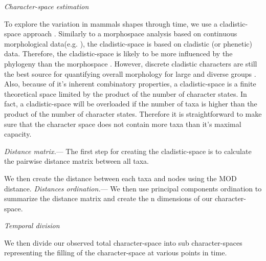 \documentclass[12pt,letterpaper]{article}
\renewcommand{\subsection}[1]{%
\bigskip
\begin{center}
\begin{large}
\normalfont\itshape #1
\end{large}
\end{center}}
\renewcommand{\subsubsection}[1]{%
\vspace{2ex}
\noindent
\textit{#1.}---}
\begin{document}
\subsection{Character-space estimation}
To explore the variation in mammals shapes through time, we use a cladistic-space approach \cite{Foote01071994,Foote29111996,Wesley-Hunt2005,Brusatte12092008,friedmanexplosive2010,toljagictriassic-jurassic2013}. Similarly to a morphospace analysis based on continuous morphological data(e.g. \cite{finlay2015morphological}), the cladistic-space is based on cladistic (or phenetic) data. Therefore, the cladistic-space is likely to be more influenced by the phylogeny than the morphospace \citep{Foote29111996,Wagner01011997}. However, discrete cladistic characters are still the best source for quantifying overall morphology for large and diverse groups \citep{Brusatte12092008}. Also, because of it's inherent combinatory properties, a cladistic-space is a finite theoretical space limited by the product of the number of character states. In fact, a cladistic-space will be overloaded if the number of taxa is higher than the product of the number of character states. Therefore it is straightforward to make sure that the character space does not contain more taxa than it's maximal capacity.

\subsubsection{Distance matrix}
The first step for creating the cladistic-space is to calculate the pairwise distance matrix between all taxa. 


We then create the distance between each taxa and nodes using the MOD distance.
\subsubsection{Distances ordination}
We then use principal components ordination to summarize the distance matrix and create the n dimensions of our character-space.

\subsection{Temporal division}
We then divide our observed total character-space into sub character-spaces representing the filling of the character-space at various points in time.
\end{document}
